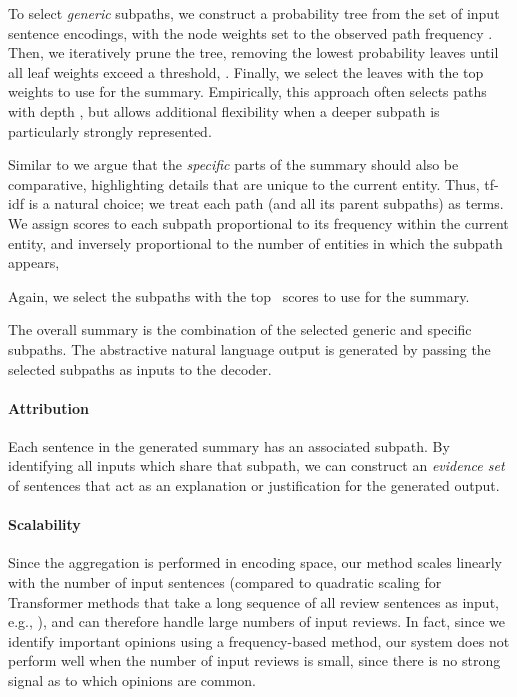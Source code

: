 \documentclass[11pt]{article}
\begin{document}
To select \textit{generic} subpaths, we construct a probability tree from the set of input sentence encodings, with the node weights set to the observed path frequency . Then, we iteratively prune the tree, removing the lowest probability leaves until all leaf weights exceed a threshold, . Finally, we select the leaves with the top~ weights to use for the summary. Empirically, this approach often selects paths with depth , but allows additional flexibility when a deeper subpath is particularly strongly represented.

Similar to \citet{iso-etal-2022-comparative} we argue that the \textit{specific} parts of the summary should also be comparative, highlighting details that are unique to the current entity. Thus, tf-idf \cite{tfidf} is a natural choice; we treat each path (and all its parent subpaths) as terms. We assign scores to each subpath  proportional to its frequency within the current entity, and inversely proportional to the number of entities in which the subpath appears,

Again, we select the subpaths with the top~ scores to use for the summary.

The overall summary is the combination of the selected generic and specific subpaths. The abstractive natural language output is generated by passing the selected subpaths as inputs to the decoder.

\paragraph{Attribution} Each sentence in the generated summary has an associated subpath. By identifying all inputs which share that subpath, we can construct an \textit{evidence set} of sentences that act as an explanation or justification for the generated output.

\paragraph{Scalability} Since the aggregation is performed in encoding space, our method scales linearly with the number of input sentences (compared to quadratic scaling for Transformer methods that take a long sequence of all review sentences as input, e.g., \citet{instructgpt}), and can therefore handle large numbers of input reviews. In fact, since we identify important opinions using a frequency-based method, our system does not perform well when the number of input reviews is small, since there is no strong signal as to which opinions are common.
\end{document}
